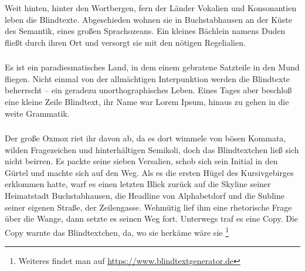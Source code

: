 \subsubsection{}
Weit hinten, hinter den Wortbergen, fern der Länder Vokalien und Konsonantien leben die Blindtexte. 
Abgeschieden wohnen sie in Buchstabhausen an der Küste des Semantik, eines großen Sprachozeans. 
Ein kleines Bächlein namens Duden fließt durch ihren Ort und versorgt sie mit den nötigen Regelialien. 
\subsubsection{}
Es ist ein paradiesmatisches Land, in dem einem gebratene Satzteile in den Mund fliegen. 
Nicht einmal von der allmächtigen Interpunktion werden die Blindtexte beherrscht -- ein geradezu unorthographisches Leben. 
Eines Tages aber beschloß eine kleine Zeile Blindtext, ihr Name war Lorem Ipsum, hinaus zu gehen in die weite Grammatik. 
\subsubsection{}
Der große Oxmox riet ihr davon ab, da es dort wimmele von bösen Kommata, wilden Fragezeichen und hinterhältigen Semikoli, doch das Blindtextchen ließ sich nicht beirren. 
Es packte seine sieben Versalien, schob sich sein Initial in den Gürtel und machte sich auf den Weg. 
Als es die ersten Hügel des Kursivgebirges erklommen hatte, warf es einen letzten Blick zurück auf die Skyline seiner Heimatstadt Buchstabhausen, die Headline von Alphabetdorf und die Subline seiner eigenen Straße, der Zeilengasse. 
Wehmütig lief ihm eine rhetorische Frage über die Wange, dann setzte es seinen Weg fort. 
Unterwegs traf es eine Copy. Die Copy warnte das Blindtextchen, da, wo sie herkäme wäre sie%
\footnote{Weiteres findet man auf \href{https://www.blindtextgenerator.de}{https://www.blindtextgenerator.de}}

